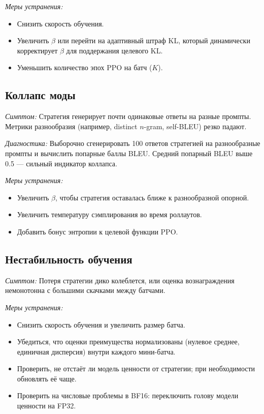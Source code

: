 \emph{Меры устранения:}
\begin{itemize}[leftmargin=*]
  \item Снизить скорость обучения.
  \item Увеличить $\beta$ или перейти на адаптивный штраф KL, который динамически корректирует $\beta$ для поддержания целевого KL.
  \item Уменьшить количество эпох PPO на батч ($K$).
\end{itemize}

\subsection{Коллапс моды}

\emph{Симптом:} Стратегия генерирует почти одинаковые ответы на разные промпты. Метрики разнообразия (например, distinct $n$-gram, self-BLEU) резко падают.

\emph{Диагностика:} Выборочно сгенерировать 100 ответов стратегией на разнообразные промпты и вычислить попарные баллы BLEU. Средний попарный BLEU выше 0.5 --- сильный индикатор коллапса.

\emph{Меры устранения:}
\begin{itemize}[leftmargin=*]
  \item Увеличить $\beta$, чтобы стратегия оставалась ближе к разнообразной опорной.
  \item Увеличить температуру сэмплирования во время роллаутов.
  \item Добавить бонус энтропии к целевой функции PPO.
\end{itemize}

\subsection{Нестабильность обучения}

\emph{Симптом:} Потеря стратегии дико колеблется, или оценка вознаграждения немонотонна с большими скачками между батчами.

\emph{Меры устранения:}
\begin{itemize}[leftmargin=*]
  \item Снизить скорость обучения и увеличить размер батча.
  \item Убедиться, что оценки преимущества нормализованы (нулевое среднее, единичная дисперсия) внутри каждого мини-батча.
  \item Проверить, не отстаёт ли модель ценности от стратегии; при необходимости обновлять её чаще.
  \item Проверить на числовые проблемы в BF16: переключить голову модели ценности на FP32.
\end{itemize}

